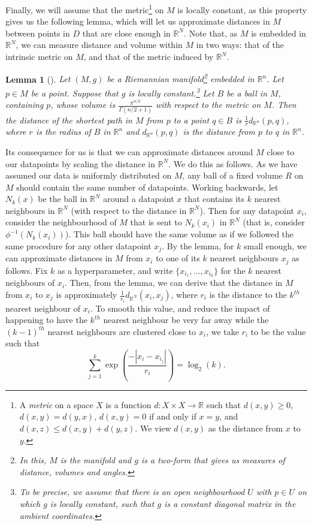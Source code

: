\documentclass[a4paper,11pt,leqno]{article}
\newcommand{\RR}{\mathbb{R}}
\newtheorem*{lemma}{Lemma}
\theoremstyle{definition}
\begin{document}
Finally, we will assume that the metric\footnote{
A \textit{metric} on a space $X$ is a function $d: X\times X\to \RR$ such that $d(x, y) \geq 0$, $d(x, y) = d(y, x)$, $d(x, y) = 0$ if and only if $x = y$, and $d(x, z) \leq d(x, y) + d(y, z)$.
We view $d(x, y)$ as the distance from $x$ to $y$.
}
 on $M$ is locally constant, as this property gives us the following lemma, which will let us approximate distances in $M$ between points in $D$ that are close enough in $\RR^N$.
 Note that, as $M$ is embedded in $\RR^N$, we can measure distance and volume within $M$ in two ways: that of the intrinsic metric on $M$, and that of the metric induced by $\RR^N$.

\begin{lemma}[\cite{McInnes18}]
Let $(M, g)$ be a Riemannian manifold\footnote{
In this, $M$ is the manifold and $g$ is a two-form that gives us measures of distance, volumes and angles.}
 embedded in $\RR^n$. Let $p\in M$ be a point. Suppose that $g$ is locally constant.\footnote{
To be precise, we assume that there is an open neighbourhood $U$ with $p\in U$ on which $g$ is locally constant, such that $g$ is a constant diagonal matrix in the ambient coordinates.}
Let $B$ be a ball in $M$, containing $p$, whose volume is $\frac{\pi^{n/2}}{\Gamma(n/2+1)}$ with respect to the metric on $M$. 
Then the distance of the shortest path in $M$ from $p$ to a point $q\in B$ is
$\frac{1}{r}d_{\RR^n}(p, q)$, where $r$ is the radius of $B$ in $\RR^n$ and $d_{\RR^n}(p, q)$ is the distance from $p$ to $q$ in $\RR^n$.
\end{lemma}

Its consequence for us is that we can approximate distances around $M$ close to our datapoints by scaling the distance in $\RR^N$.
We do this as follows.
 As we have assumed our data is uniformly distributed on $M$, any ball of a fixed volume $R$ on $M$ should contain the same number of datapoints.
Working backwards, let $N_k(x)$ be the ball in $\RR^N$ around a datapoint $x$ that contains its $k$ nearest neighbours in $\RR^N$ (with respect to the distance in $\RR^N$).
Then for any datapoint $x_i$, consider the neighbourhood of $M$ that is sent to $N_k(x_i)$ in $\RR^N$ (that is, consider $\phi^{-1}(N_k(x_i))$).
This ball should have the same volume as if we followed the same procedure for any other datapoint $x_j$.
By the lemma, for $k$ small enough, we can approximate distances in $M$ from $x_i$ to one of its $k$ nearest neighbours $x_j$ as follows.
Fix $k$ as a hyperparameter, and write $\{x_{i_1},\dots, x_{i_k}\}$ for the $k$ nearest neighbours of $x_i$.
Then, from the lemma, we can derive that the distance in $M$ from $x_i$ to $x_j$ is approximately $\frac{1}{r_i}d_{\RR^N}(x_i, x_j)$, where $r_i$ is the distance to the $k^{th}$ nearest neighbour of $x_i$.
To smooth this value, and reduce the impact of happening to have the $k^{th}$ nearest neighbour be very far away while the $(k-1)^{th}$ nearest neighbours are clustered close to $x_i$, we take $r_i$ to be the value such that
$$\sum_{j=1}^k\exp\left(\frac{-|x_i-x_{i_j}|}{r_i}\right) = \log_2(k).$$
\end{document}
